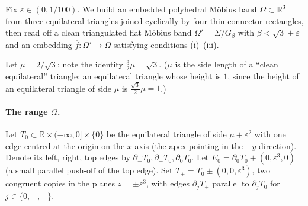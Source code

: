 \documentclass[12pt]{article}
\newcommand{\R}{\mathbb{R}}
\newcommand{\eps}{\varepsilon}
\newcommand{\Sig}{\Sigma}
\begin{document}
Fix $\eps\in(0,1/100)$. We build an embedded polyhedral M\"obius band
$\Omega\subset\R^3$ from three equilateral triangles joined cyclically by
four thin connector rectangles, then read off a clean triangulated flat
M\"obius band $\Omega'=\Sig/G_\beta$ with $\beta<\sqrt3+\eps$ and an
embedding $\overline f:\Omega'\to\Omega$ satisfying conditions (i)--(iii).

Let $\mu=2/\sqrt3$; note the identity $\tfrac32\mu=\sqrt3$. ($\mu$ is the
side length of a ``clean equilateral'' triangle: an equilateral triangle
whose height is $1$, since the height of an equilateral triangle of side
$\mu$ is $\tfrac{\sqrt3}{2}\mu=1$.)

\paragraph{The range $\Omega$.}
Let $T_0\subset \R\times(-\infty,0]\times\{0\}$ be the equilateral
triangle of side $\mu+\eps^2$ with one edge centred at the origin on the
$x$-axis (the apex pointing in the $-y$ direction). Denote its left,
right, top edges by $\partial_-T_0,\partial_+T_0,\partial_0T_0$. Let
$E_0=\partial_0T_0+(0,\eps^3,0)$ (a small parallel push-off of the top
edge). Set $T_\pm=T_0\pm(0,0,\eps^3)$, two congruent copies in the planes
$z=\pm\eps^3$, with edges $\partial_jT_\pm$ parallel to $\partial_jT_0$
for $j\in\{0,+,-\}$.
\end{document}
